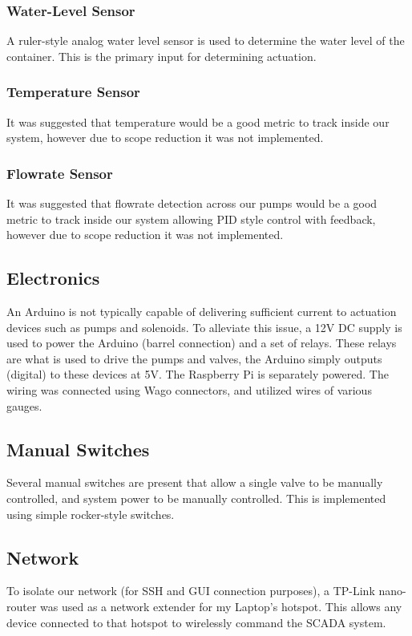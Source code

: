 \documentclass[../main.tex]{subfiles}
\begin{document}
\subsubsection{Water-Level Sensor} A ruler-style analog water level sensor is used to determine the water level of the container. This is the primary input for determining actuation.

\subsubsection{Temperature Sensor} It was suggested that temperature would be a good metric to track inside our system, however due to scope reduction it was not implemented.

\subsubsection{Flowrate Sensor} It was suggested that flowrate detection across our pumps would be a good metric to track inside our system allowing PID style control with feedback, however due to scope reduction it was not implemented.

\subsection{Electronics}
An Arduino is not typically capable of delivering sufficient current to actuation devices such as pumps and solenoids. To alleviate this issue, a 12V DC supply is used to power the Arduino (barrel connection) and a set of relays. These relays are what is used to drive the pumps and valves, the Arduino simply outputs (digital) to these devices at 5V. The Raspberry Pi is separately powered. The wiring was connected using Wago connectors, and utilized wires of various gauges.

\subsection{Manual Switches}
Several manual switches are present that allow a single valve to be manually controlled, and system power to be manually controlled. This is implemented using simple rocker-style switches.

\subsection{Network}
To isolate our network (for SSH and GUI connection purposes), a TP-Link nano-router was used as a network extender for my Laptop's hotspot. This allows any device connected to that hotspot to wirelessly command the SCADA system.
\end{document}
